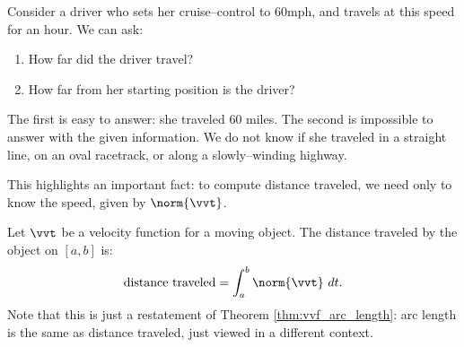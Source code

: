 Consider a driver who sets her cruise--control to 60mph, and travels at this speed for an hour. We can ask:
\begin{enumerate}
	\item How far did the driver travel?
	\item	How far from her starting position is the driver?
\end{enumerate} 
The first is easy to answer: she traveled 60 miles. The second is impossible to answer with the given information. We do not know if she traveled in a straight line, on an oval racetrack, or along a slowly--winding highway.

This highlights an important fact: to compute distance traveled, we need only to know the speed, given by $\norm{\vvt}$.

{Let $\vvt$ be a velocity function for a moving object. The distance traveled by the object on $[a,b]$ is:
$$\text{distance traveled} = \int_a^b \norm{\vvt}\ dt.$$
}
Note that this is just a restatement of Theorem \ref{thm:vvf_arc_length}: arc length is the same as distance traveled, just viewed in a different context.\\


